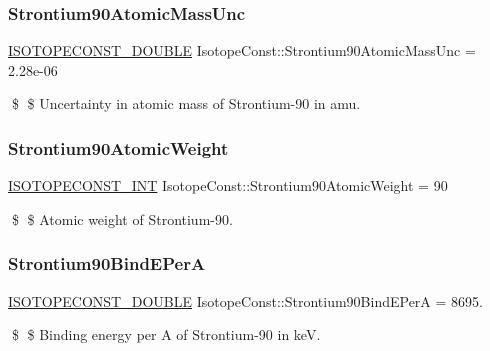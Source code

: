 \subsubsection{\texorpdfstring{Strontium90\+Atomic\+Mass\+Unc}{Strontium90AtomicMassUnc}}
{\footnotesize\ttfamily \mbox{\hyperlink{group___isotope_const-_macros_ga8f45a7272ce02c0b4c65c44636ed719a}{I\+S\+O\+T\+O\+P\+E\+C\+O\+N\+S\+T\+\_\+\+D\+O\+U\+B\+LE}} Isotope\+Const\+::\+Strontium90\+Atomic\+Mass\+Unc = 2.\+28e-\/06}

\$ \$ Uncertainty in atomic mass of Strontium-\/90 in amu. \mbox{\label{group___isotope_const-_strontium-_sr90_gaf3d55838462db24b13661e4cbf6efd03}} 
\subsubsection{\texorpdfstring{Strontium90\+Atomic\+Weight}{Strontium90AtomicWeight}}
{\footnotesize\ttfamily \mbox{\hyperlink{group___isotope_const-_macros_ga5f18360b3e99483a35c32d789e62621c}{I\+S\+O\+T\+O\+P\+E\+C\+O\+N\+S\+T\+\_\+\+I\+NT}} Isotope\+Const\+::\+Strontium90\+Atomic\+Weight = 90}

\$ \$ Atomic weight of Strontium-\/90. \mbox{\label{group___isotope_const-_strontium-_sr90_gaa7439fc9a9794e1659e3df35354e8673}} 
\subsubsection{\texorpdfstring{Strontium90\+Bind\+E\+PerA}{Strontium90BindEPerA}}
{\footnotesize\ttfamily \mbox{\hyperlink{group___isotope_const-_macros_ga8f45a7272ce02c0b4c65c44636ed719a}{I\+S\+O\+T\+O\+P\+E\+C\+O\+N\+S\+T\+\_\+\+D\+O\+U\+B\+LE}} Isotope\+Const\+::\+Strontium90\+Bind\+E\+PerA = 8695.}

\$ \$ Binding energy per A of Strontium-\/90 in keV. \mbox{\label{group___isotope_const-_strontium-_sr90_ga777af5895001fce7438d23b44cf07622}} 
